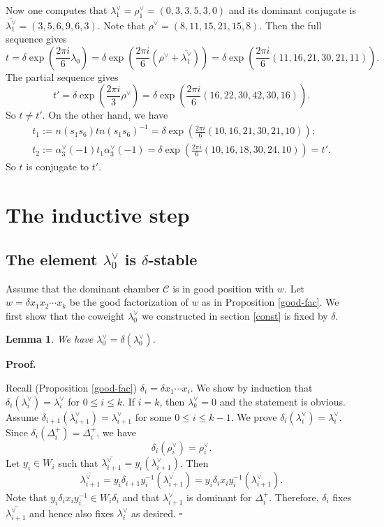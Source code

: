 \documentclass[10pt,leqno]{article}
\newtheorem{lemma}[equation]{Lemma}
\newcommand{\qed}{\hfill $\square$ \medskip}
\newenvironment{proof}[1][Proof]{\noindent\textbf{#1.} }{\qed}
\newcommand{\caC}{\mathcal C}
\renewcommand{\a}{\mathfrak a}
\renewcommand{\sec}[1]{\section{#1}
\renewcommand{\theequation}{\thesection.\arabic{equation}}
  \setcounter{equation}{0}}
\def\le{\leqslant}
\def\a{\alpha}
\def\d{\delta}
\def\l{\lambda}
\renewcommand{\sec}[1]{\section{#1}
\renewcommand{\theequation}{\thesection.\arabic{equation}}
  \setcounter{equation}{0}}
\begin{document}
Now one computes that $\l_1^\vee = \rho_1^\vee=(0, 3, 3, 5, 3, 0)$ and its dominant conjugate is $\overline{\l_1^\vee}=(3, 5, 6, 9, 6, 3)$. Note that $\rho^\vee=(8, 11, 15, 21, 15, 8)$. Then the full sequence gives
$$
t=\delta \exp(\frac{2\pi i}{6} \l_0)=\delta\exp(\frac{2\pi i}{6} (\rho^\vee + \overline{\l_1^\vee}))=\delta \exp(\frac{2\pi i}{6} (11, 16, 21, 30, 21, 11)).
$$
The partial sequence gives
$$
t'=\delta \exp(\frac{2\pi i}{3} \rho^\vee)=
\delta \exp(\frac{2\pi i}{6} (16, 22, 30, 42, 30, 16)).
$$
So $t \neq t'$. On the other hand, we have
\begin{gather*} t_1:=n(s_1 s_6) t n(s_1 s_6)^{-1} =\delta \exp(\frac{2\pi i}{6}(10, 16, 21, 30, 21, 10)); \\
t_2:=\a_3^\vee(-1) t_1 \a_3^\vee(-1)=\delta \exp(\frac{2\pi i}{6}(10, 16, 18, 30, 24, 10))=t'.
\end{gather*}
So $t$ is conjugate to $t'$.

\bigskip

\sec{The inductive step}

\subsection{The element $\l_0^\vee$ is $\d$-stable}
Assume that the dominant chamber $\caC$ is in good position with
$w$. Let $w=\d x_1 x_2 \cdots x_k$ be the good factorization of $w$ as
in Proposition \ref{good-fac}. We first show that the coweight
$\l_0^\vee$ we constructed in section \ref{const} is fixed by $\d$.

\begin{lemma} \label{dom}
	We have $\l_0^\vee =\delta (\l_0^\vee)$.
\end{lemma}
\begin{proof}

  Recall (Proposition \ref{good-fac})  $\d_i=\delta x_1 \cdots x_{i}$. We show by induction that
  $\d_{i}(\l^\vee_{i})=\l^\vee_{i}$ for $0 \le i \le k$. If $i=k$,
  then $\l_k^\vee = 0$ and the statement is obvious. Assume
  $\d_{i+1}(\l_{i+1}^\vee) = \l_{i+1}^\vee$ for some
  $0 \le i \le k-1$. We prove $\d_i(\l_i^\vee)=\l_i^\vee$. Since
  $\d_{i}(\Delta_i^+)=\Delta_i^+$, we
  have $$\d_{i}(\rho_i^\vee)=\rho_i^\vee.$$ Let $y_i \in W_i$ such
  that $\overline{\l_{i+1}^\vee} =
  y_i(\l_{i+1}^\vee)$. Then
  $$\overline{\l_{i+1}^\vee}=y_i \d_{i+1} y_i^{-1}
  (\overline{\l_{i+1}^\vee}) =y_i \d_i x_i y_i^{-1}
  (\overline{\l_{i+1}^\vee}).$$ Note that
  $y_i \d_i x_i y_i^{-1} \in W_i\delta_i$ and that
  $\overline{\l_{i+1}^\vee}$ is dominant for $\Delta_i^+$. Therefore,
  $\d_i$ fixes $\overline{\l_{i+1}^\vee}$ and hence also fixes
  $\l_i^\vee$ as desired.
\end{proof}
\end{document}
